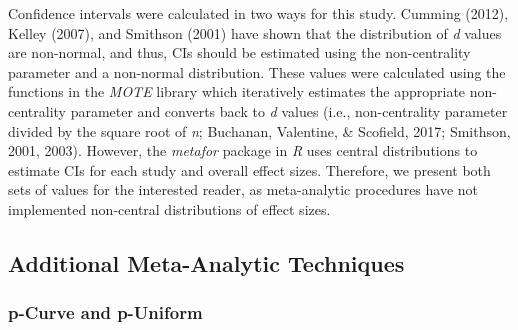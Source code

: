 \documentclass[man, mask]{apa6}
\theoremstyle{definition}
\theoremstyle{definition}
\theoremstyle{definition}
\theoremstyle{remark}
\begin{document}
Confidence intervals were calculated in two ways for this study. Cumming
(2012), Kelley (2007), and Smithson (2001) have shown that the
distribution of \emph{d} values are non-normal, and thus, CIs should be
estimated using the non-centrality parameter and a non-normal
distribution. These values were calculated using the functions in the
\emph{MOTE} library which iteratively estimates the appropriate
non-centrality parameter and converts back to \emph{d} values (i.e.,
non-centrality parameter divided by the square root of \emph{n};
Buchanan, Valentine, \& Scofield, 2017; Smithson, 2001, 2003). However,
the \emph{metafor} package in \emph{R} uses central distributions to
estimate CIs for each study and overall effect sizes. Therefore, we
present both sets of values for the interested reader, as meta-analytic
procedures have not implemented non-central distributions of effect
sizes.

\subsection{Additional Meta-Analytic
Techniques}\label{additional-meta-analytic-techniques}

\subsubsection{p-Curve and p-Uniform}\label{p-curve-and-p-uniform}
\end{document}
